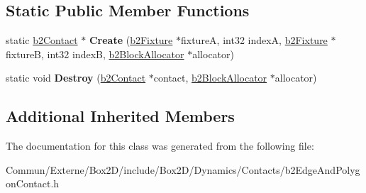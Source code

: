 \subsection*{Static Public Member Functions}
\begin{DoxyCompactItemize}
\item 
static \hyperlink{classb2_contact}{b2\+Contact} $\ast$ {\bfseries Create} (\hyperlink{classb2_fixture}{b2\+Fixture} $\ast$fixtureA, int32 indexA, \hyperlink{classb2_fixture}{b2\+Fixture} $\ast$fixtureB, int32 indexB, \hyperlink{classb2_block_allocator}{b2\+Block\+Allocator} $\ast$allocator)\hypertarget{classb2_edge_and_polygon_contact_a43c450ab34c63cb7dca91ed04a6bacaf}{}\label{classb2_edge_and_polygon_contact_a43c450ab34c63cb7dca91ed04a6bacaf}

\item 
static void {\bfseries Destroy} (\hyperlink{classb2_contact}{b2\+Contact} $\ast$contact, \hyperlink{classb2_block_allocator}{b2\+Block\+Allocator} $\ast$allocator)\hypertarget{classb2_edge_and_polygon_contact_aefebb57eb58fa87a609033b0d4991a66}{}\label{classb2_edge_and_polygon_contact_aefebb57eb58fa87a609033b0d4991a66}

\end{DoxyCompactItemize}
\subsection*{Additional Inherited Members}


The documentation for this class was generated from the following file\+:\begin{DoxyCompactItemize}
\item 
Commun/\+Externe/\+Box2\+D/include/\+Box2\+D/\+Dynamics/\+Contacts/b2\+Edge\+And\+Polygon\+Contact.\+h\end{DoxyCompactItemize}
